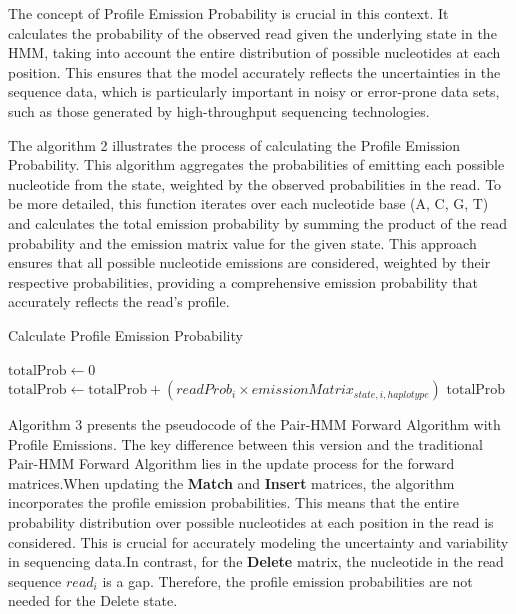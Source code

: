 \documentclass[PhD]{PHlab-thesis}
\begin{document}
The concept of Profile Emission Probability is crucial in this context. It calculates the probability of the observed read given the underlying state in the HMM, taking into account the entire distribution of possible nucleotides at each position. This ensures that the model accurately reflects the uncertainties in the sequence data, which is particularly important in noisy or error-prone data sets, such as those generated by high-throughput sequencing technologies.

The algorithm 2 illustrates the process of calculating the Profile Emission Probability. This algorithm aggregates the probabilities of emitting each possible nucleotide from the state, weighted by the observed probabilities in the read. To be more detailed, this function iterates over each nucleotide base (A, C, G, T) and calculates the total emission probability by summing the product of the read probability and the emission matrix value for the given state. This approach ensures that all possible nucleotide emissions are considered, weighted by their respective probabilities, providing a comprehensive emission probability that accurately reflects the read's profile.
\vspace{0.5cm} %
\begin{algorithm}
\caption{Calculate Profile Emission Probability}
\begin{algorithmic}[1]
    \State $\text{totalProb} \gets 0$ 
            \State $\text{totalProb} \gets \text{totalProb} + (readProb_{i} \times emissionMatrix_{state,i,haplotype})$ 
    \EndFor
    \State \Return $\text{totalProb}$ 
\EndFunction
\end{algorithmic}
\end{algorithm}
\vspace{0.5cm} %
\newpage
Algorithm 3 presents the pseudocode of the Pair-HMM Forward Algorithm with Profile Emissions. The key difference between this version and the traditional Pair-HMM Forward Algorithm lies in the update process for the forward matrices.When updating the \textbf{Match} and \textbf{Insert} matrices, the algorithm incorporates the profile emission probabilities. This means that the entire probability distribution over possible nucleotides at each position in the read is considered. This is crucial for accurately modeling the uncertainty and variability in sequencing data.In contrast, for the \textbf{Delete} matrix, the nucleotide in the read sequence $read_{i}$ is a gap. Therefore, the profile emission probabilities are not needed for the Delete state.
\end{document}
